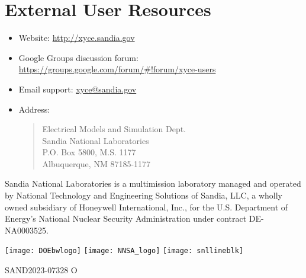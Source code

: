 \documentclass[letterpaper]{scrartcl}
\begin{document}
\section{External User Resources}
\begin{itemize}
  \item Website: {\color{XyceDeepRed}\url{http://xyce.sandia.gov}}
  \item Google Groups discussion forum:
    {\color{XyceDeepRed}\url{https://groups.google.com/forum/#!forum/xyce-users}}
  \item Email support:
    {\color{XyceDeepRed}\href{mailto:xyce@sandia.gov}{xyce@sandia.gov}}
  \item Address:
    \begin{quote}
            Electrical Models and Simulation Dept.\\
            Sandia National Laboratories\\
            P.O. Box 5800, M.S. 1177\\
            Albuquerque, NM 87185-1177 \\
    \end{quote}
\end{itemize}

\vspace*{\fill}
\noindent
Sandia National Laboratories is a multimission laboratory managed and
operated by National Technology and Engineering Solutions of Sandia,
LLC, a wholly owned subsidiary of Honeywell International, Inc., for
the U.S. Department of Energy's National Nuclear Security
Administration under contract DE-NA0003525.

\vspace{0.2in}
\noindent
\parbox{\textwidth}
{
    \texttt{[image: DOEbwlogo]}
    \hfill
    \texttt{[image: NNSA\_logo]}
    \hfill
    \texttt{[image: snllineblk]}
}
\vspace{0.1in}

\parbox{\textwidth}{\hfill SAND2023-07328 O}
\end{document}
